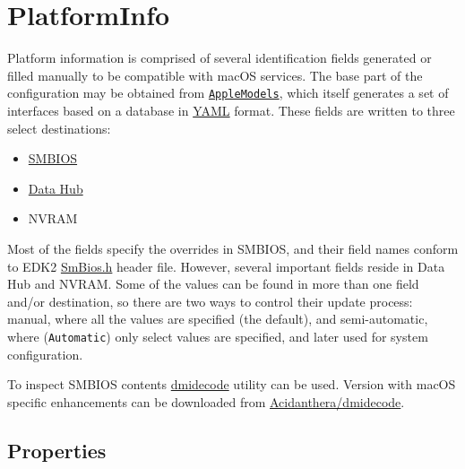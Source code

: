 \documentclass[]{article}
\providecommand{\tightlist}{%
  \setlength{\itemsep}{0pt}\setlength{\parskip}{0pt}}
\begin{document}
\section{PlatformInfo}\label{platforminfo}

Platform information is comprised of several identification fields
generated or filled manually to be compatible with macOS services. The
base part of the configuration may be obtained from
\href{https://github.com/acidanthera/OpenCorePkg/blob/master/AppleModels}{\texttt{AppleModels}},
which itself generates a set of interfaces based on a database
in \href{https://yaml.org/spec/1.2/spec.html}{YAML} format. These fields
are written to three select destinations:

\begin{itemize}
\tightlist
\item
  \href{https://www.dmtf.org/standards/smbios}{SMBIOS}
\item
  \href{https://github.com/acidanthera/OpenCorePkg/blob/master/Include/Intel/Protocol/DataHub.h}{Data
  Hub}
\item
  NVRAM
\end{itemize}

Most of the fields specify the overrides in SMBIOS, and their field
names conform to EDK2
\href{https://github.com/acidanthera/audk/blob/master/MdePkg/Include/IndustryStandard/SmBios.h}{SmBios.h}
header file. However, several important fields reside in Data Hub and
NVRAM. Some of the values can be found in more than one field and/or
destination, so there are two ways to control their update process:
manual, where all the values are specified (the default), and semi-automatic,
where (\texttt{Automatic}) only select values are specified, and later used
for system configuration.

To inspect SMBIOS contents \href{http://www.nongnu.org/dmidecode}{dmidecode} utility can
be used. Version with macOS specific enhancements can be downloaded from
\href{https://github.com/acidanthera/dmidecode/releases}{Acidanthera/dmidecode}.

\subsection{Properties}\label{platforminfoprops}
\end{document}
